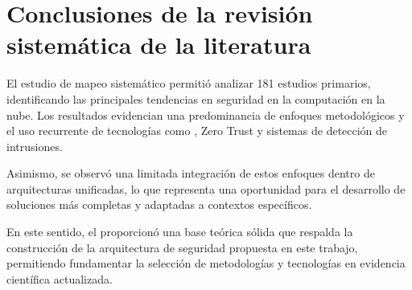 \section{Conclusiones de la revisión sistemática de la literatura}
\noindent
El estudio de mapeo sistemático permitió analizar 181 estudios primarios, identificando las principales tendencias en seguridad en 
la computación en la nube. Los resultados evidencian una predominancia de enfoques metodológicos y el uso recurrente de tecnologías 
como \SIEM, Zero Trust y sistemas de detección de intrusiones.

Asimismo, se observó una limitada integración de estos enfoques dentro de arquitecturas unificadas, lo que representa una oportunidad 
para el desarrollo de soluciones más completas y adaptadas a contextos específicos.

En este sentido, el \SMS proporcionó una base teórica sólida que respalda la construcción de la arquitectura de seguridad propuesta en 
este trabajo, permitiendo fundamentar la selección de metodologías y tecnologías en evidencia científica actualizada.
